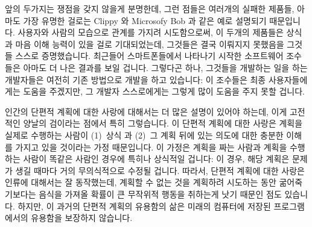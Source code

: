 앞의 두가지는 쟁점을 갖지 않을게 분명한데, 그런 점들은 여러개의 실패한 제품들,
아마도 가장 유명한 걸로는 Clippy 와 Microsofy Bob 과 같은 예로 설명되기
때문입니다.
사용자와 사람의 모습으로 관계를 가지려 시도함으로써, 이 두개의 제품들은 상식과
마음 이해 능력이 있을 걸로 기대되었는데, 그것들은 결국 이뤄지지 못했음을 그것들
스스로 증명했습니다.
최근들어 스마트폰들에서 나타나기 시작한 소프트웨어 조수들은 아마도 더 나은
결과를 보일 겁니다.
그렇다곤 하나, 그것들을 개발하는 일을 하는 개발자들은 여전히 기존 방법으로
개발을 하고 있습니다: 이 조수들은 최종 사용자들에게는 도움을 주겠지만, 그
개발자 스스로에게는 그렇게 많이 도움을 주지 못할 겁니다.

인간의 단편적 계획에 대한 사랑에 대해서는 더 많은 설명이 있어야 하는데, 이게
고전적인 양날의 검이라는 점에서 특히 그렇습니다.
이 단편적 계획에 대한 사랑은 계획을 실제로 수행하는 사람이 (1)~상식 과 (2)~그
계획 뒤에 있는 의도에 대한 충분한 이해를 가지고 있을 것이라는 가정 때문입니다.
이 가정은 계획을 짜는 사람과 계획을 수행하는 사람이 똑같은 사람인 경우에 특히나
상식적일 겁니다: 이 경우, 해당 계획은 문제가 생길 때마다 거의 무의식적으로
수정될 겁니다.
따라서, 단편적 계획에 대한 사랑은 인류에 대해서는 잘 동작했는데, 계획할 수 없는
것을 계획하려 시도하는 동안 굶어죽기보다는 음식을 가져올 확률이 큰 무작위적
행동을 취하는게 낫기 때문인 점도 있습니다.
하지만, 이 과거의 단편적 계획의 유용함의 삶은 미래의 컴퓨터에 저장된
프로그램에서의 유용함을 보장하지 않습니다.

